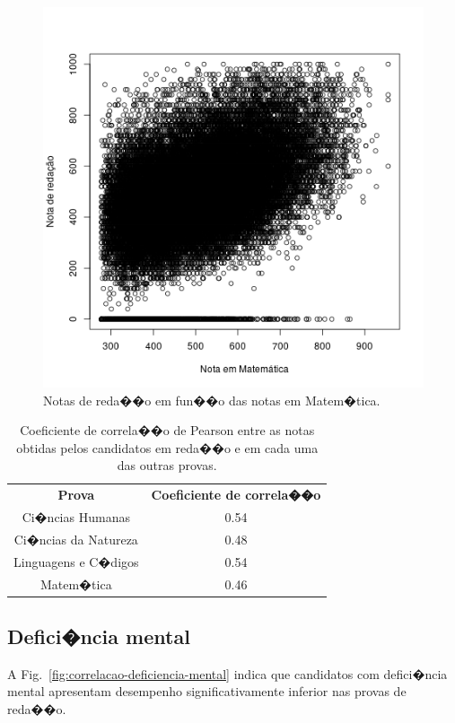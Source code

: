 \documentclass[12pt]{article}
\newcommand{\reffig}[1]{Fig.~\ref{fig:#1}}
\begin{document}
\begin{minipage}{.5\textwidth}
    \begin{figure}[H]
    \centering\includegraphics[width=\linewidth]{../correlacao_nota_mt.png}
    \caption{Notas de reda��o em fun��o das notas em Matem�tica.}
    \label{fig:correlacao-nota-mt}
    \end{figure}
\end{minipage}

\begin{table}[H]
\centering\begin{tabular}{ c c }
  \textbf{Prova}       & \textbf{Coeficiente de correla��o} \\
  Ci�ncias Humanas     & 0.54 \\
  Ci�ncias da Natureza & 0.48 \\
  Linguagens e C�digos & 0.54 \\
  Matem�tica           & 0.46 \\
\end{tabular}
\caption{Coeficiente de correla��o de Pearson entre as notas obtidas pelos candidatos em reda��o e em cada uma das outras provas.}
\label{tab:coeficiente-pearson-por-prova}
\end{table}

\subsection{Defici�ncia mental}
A \reffig{correlacao-deficiencia-mental} indica que candidatos com defici�ncia mental apresentam desempenho significativamente inferior nas provas de reda��o.
\end{document}
